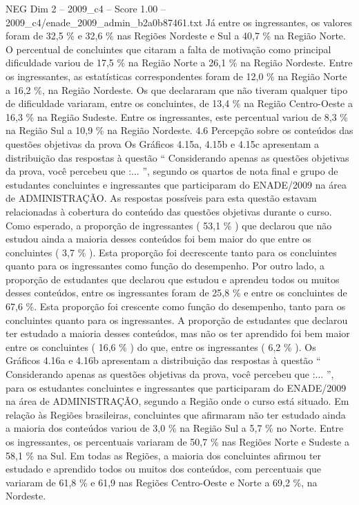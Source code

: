 \begin{textsample}{NEG Dim 2 – 2009\_c4 – Score 1.00 – 2009\_c4/enade\_2009\_admin\_b2a0b87461.txt}
Já entre os ingressantes, os valores foram de 32,5 \% e 32,6 \% nas Regiões Nordeste e Sul a 40,7 \% na Região Norte.
O percentual de concluintes que citaram a falta de motivação como principal dificuldade variou de 17,5 \% na Região Norte a 26,1 \% na Região Nordeste.
Entre os ingressantes, as estatísticas correspondentes foram de 12,0 \% na Região Norte a 16,2 \%, na Região Nordeste.
Os que declararam que não tiveram qualquer tipo de dificuldade variaram, entre os concluintes, de 13,4 \% na Região Centro-Oeste a 16,3 \% na Região Sudeste.
Entre os ingressantes, este percentual variou de 8,3 \% na Região Sul a 10,9 \% na Região Nordeste. 4.6 Percepção sobre os conteúdos das questões objetivas da prova Os Gráficos 4.15a, 4.15b e 4.15c apresentam a distribuição das respostas à questão “ Considerando apenas as questões objetivas da prova, você percebeu que :... ”, segundo os quartos de nota final e grupo de estudantes concluintes e ingressantes que participaram do ENADE/2009 na área de ADMINISTRAÇÃO.
As respostas possíveis para esta questão estavam relacionadas à cobertura do conteúdo das questões objetivas durante o curso.
Como esperado, a proporção de ingressantes ( 53,1 \% ) que declarou que não estudou ainda a maioria desses conteúdos foi bem maior do que entre os concluintes ( 3,7 \% ).
Esta proporção foi decrescente tanto para os concluintes quanto para os ingressantes como função do desempenho.
Por outro lado, a proporção de estudantes que declarou que estudou e aprendeu todos ou muitos desses conteúdos, entre os ingressantes foram de 25,8 \% e entre os concluintes de 67,6 \%.
Esta proporção foi crescente como função do desempenho, tanto para os concluintes quanto para os ingressantes.
A proporção de estudantes que declarou ter estudado a maioria desses conteúdos, mas não os ter aprendido foi bem maior entre os concluintes ( 16,6 \% ) do que, entre os ingressantes ( 6,2 \% ).
Os Gráficos 4.16a e 4.16b apresentam a distribuição das respostas à questão “ Considerando apenas as questões objetivas da prova, você percebeu que :... ”, para os estudantes concluintes e ingressantes que participaram do ENADE/2009 na área de ADMINISTRAÇÃO, segundo a Região onde o curso está situado.
Em relação às Regiões brasileiras, concluintes que afirmaram não ter estudado ainda a maioria dos conteúdos variou de 3,0 \% na Região Sul a 5,7 \% no Norte.
Entre os ingressantes, os percentuais variaram de 50,7 \% nas Regiões Norte e Sudeste a 58,1 \% na Sul.
Em todas as Regiões, a maioria dos concluintes afirmou ter estudado e aprendido todos ou muitos dos conteúdos, com percentuais que variaram de 61,8 \% e 61,9 nas Regiões Centro-Oeste e Norte a 69,2 \%, na Nordeste.

\end{textsample}

